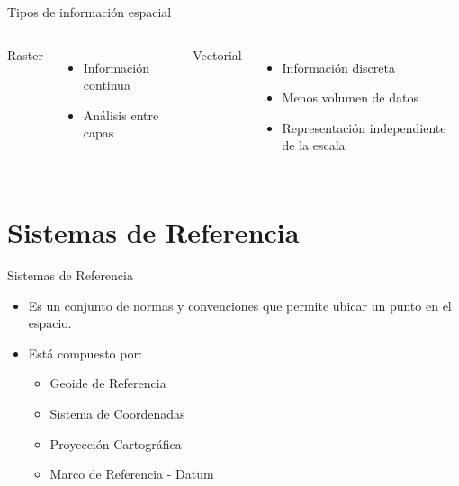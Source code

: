 \documentclass{beamer}
\begin{document}
\begin{frame}{Tipos de información espacial}
	\begin{columns}[t]
		Raster
		\begin{itemize}
			\item Información continua
			\item Análisis entre capas
		\end{itemize}
		Vectorial
		\begin{itemize}
			\item Información discreta
			\item Menos volumen de datos
			\item Representación independiente de la escala
		\end{itemize}
	\end{columns}
\end{frame}

\section{Sistemas de Referencia}

\begin{frame}{Sistemas de Referencia}
	\begin{itemize}
		\item Es un conjunto de normas y convenciones que permite ubicar un punto en el espacio.
		\item Está compuesto por: 
		\begin{itemize}
			\item Geoide de Referencia
			\item Sistema de Coordenadas
			\item Proyección Cartográfica
			\item Marco de Referencia - Datum 
		\end{itemize}
	\end{itemize}
\end{frame}
\end{document}
